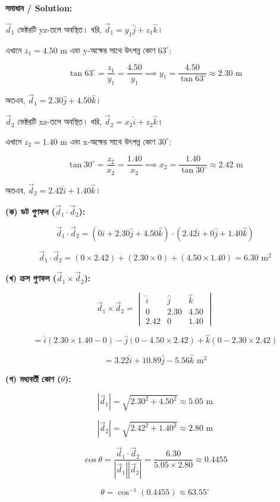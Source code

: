 \documentclass[11pt, a4paper]{article}
\begin{document}
\vspace{0.8em}
\textbf{সমাধান / Solution:}

$\vec{d}_1$ ভেক্টরটি yz-তলে অবস্থিত। ধরি, $\vec{d}_1 = y_1\hat{j} + z_1\hat{k}$।

এখানে $z_1 = 4.50\text{ m}$ এবং y-অক্ষের সাথে উৎপন্ন কোণ $63^\circ$:

$$\tan 63^\circ = \frac{z_1}{y_1} = \frac{4.50}{y_1} \implies y_1 = \frac{4.50}{\tan 63^\circ} \approx 2.30\text{ m}$$

অতএব, $\vec{d}_1 = 2.30\hat{j} + 4.50\hat{k}$।

$\vec{d}_2$ ভেক্টরটি xz-তলে অবস্থিত। ধরি, $\vec{d}_2 = x_2\hat{i} + z_2\hat{k}$।

এখানে $z_2 = 1.40\text{ m}$ এবং x-অক্ষের সাথে উৎপন্ন কোণ $30^\circ$:

$$\tan 30^\circ = \frac{z_2}{x_2} = \frac{1.40}{x_2} \implies x_2 = \frac{1.40}{\tan 30^\circ} \approx 2.42\text{ m}$$

অতএব, $\vec{d}_2 = 2.42\hat{i} + 1.40\hat{k}$।

\textbf{(ক) ডট গুণফল ($\vec{d}_1 \cdot \vec{d}_2$):}

$$\vec{d}_1 \cdot \vec{d}_2 = (0\hat{i} + 2.30\hat{j} + 4.50\hat{k}) \cdot (2.42\hat{i} + 0\hat{j} + 1.40\hat{k})$$

$$\vec{d}_1 \cdot \vec{d}_2 = (0 \times 2.42) + (2.30 \times 0) + (4.50 \times 1.40) = 6.30\text{ m}^2$$

\textbf{(খ) ক্রস গুণফল ($\vec{d}_1 \times \vec{d}_2$):}

$$\vec{d}_1 \times \vec{d}_2 = \begin{vmatrix} \hat{i} & \hat{j} & \hat{k} \\ 0 & 2.30 & 4.50 \\ 2.42 & 0 & 1.40 \end{vmatrix}$$

$$= \hat{i}(2.30 \times 1.40 - 0) - \hat{j}(0 - 4.50 \times 2.42) + \hat{k}(0 - 2.30 \times 2.42)$$

$$= 3.22\hat{i} + 10.89\hat{j} - 5.56\hat{k}\text{ m}^2$$

\textbf{(গ) মধ্যবর্তী কোণ ($\theta$):}

$$|\vec{d}_1| = \sqrt{2.30^2 + 4.50^2} \approx 5.05\text{ m}$$

$$|\vec{d}_2| = \sqrt{2.42^2 + 1.40^2} \approx 2.80\text{ m}$$

$$\cos\theta = \frac{\vec{d}_1 \cdot \vec{d}_2}{|\vec{d}_1||\vec{d}_2|} = \frac{6.30}{5.05 \times 2.80} \approx 0.4455$$

$$\theta = \cos^{-1}(0.4455) \approx 63.55^\circ$$
\end{document}
